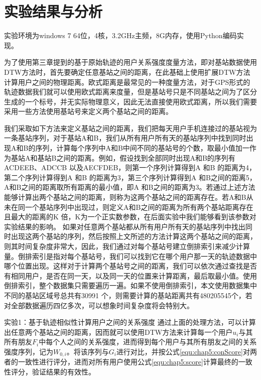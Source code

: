 \section{实验结果与分析}
\label{sec:section5-3}
实验环境为windows 7 64位，4核，3.2GHz主频，8G内存，使用Python编码实现。
\par 为了使用第三章提到的基于原始轨迹的用户关系强度度量方法，即对基站数据使用DTW方法时，首先要确定任意基站之间的距离，在此基础上使用扩展DTW方法计算用户之间的物理距离。欧式距离是最常见的一种度量方法，对于GPS形式的轨迹数据我们就可以使用欧式距离来度量，但是基站号只是不同基站之间为了区分生成的一个标号，并无实际物理意义，因此无法直接使用欧式距离，所以我们需要采用一些方法使用基站号来定义两个基站之间的距离。
\par 我们采取如下方法来定义基站之间的距离，我们把每天用户手机连接过的基站视为一条基站序列，对于基站A和B，我们从所有用户所有天的基站序列中找到同时出现A和B的序列，计算每个序列中A和B中间不同的基站号的个数，取最小值加一作为基站A和基站B之间的距离。例如，假设找到全部同时出现A和B的序列有ACDEEB、ADCCB 以及AECFDEB，则第一个序列计算得到A 和B 的距离为4，第二个序列计算得到A 和B 的距离为3，第三个序列计算得到A 和B之间的距离5，A和B之间的距离取所有距离的最小值，即A 和B之间的距离为3。若通过上述方法能够计算出两个基站之间的距离，则称为这两个基站之间的距离存在。若A和B从未在同一个基站序列中出现过，则定义A和B之间的距离为所有两个基站距离存在且最大的距离的K 倍，K为一个正实数参数，在后面实验中我们能够看到该参数对实验结果的影响。
如果对任意两个基站都从所有用户所有天的基站序列中找出同时出现这两个基站的序列，然后按照上文所述的方法计算这两个基站之间的距离，则其时间复杂度非常大，因此，我们通过对每个基站号建立倒排索引来减少计算量。倒排索引是指对每个基站号，我们可以找到它在哪个用户那一天的轨迹数据中哪个位置出现。这样对于计算两个基站号之间的距离，我们可以依次通过查找是否有相同用户，是否在同一天，以及同一天的位置来计算距离，最后取最小值。使用倒排索引，整个数据集只需要遍历一遍。如果不使用倒排索引，本文使用数据集中不同的基站区域号总共有30991 个，则需要计算的基站距离共有480205545个，若对全部数据遍历四亿多次，可以想象时间复杂度将会特别大。
\par 实验1：基于轨迹相似性计算用户之间的关系强度
通过上面的处理方法，可以计算出任意两个基站之间的距离，因而就可以使用DTW方法来计算每一个用户$u_{i}$与其所有朋友$F_{i}$中每个人之间的关系强度，进而得到每个用户与其所有朋友之间的关系强度序列，记为$W_{0,i}$。将该序列与$G_{i}$进行对比，并按公式\ref{equ:chap5:conScore}对两者的一致性进行评分，进而对所有用户使用公式\ref{equ:chap5:score}计算最终的一致性评分，验证结果的有效性。
